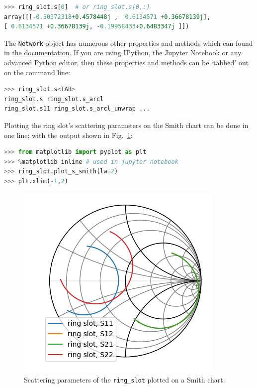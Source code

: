 \documentclass{IEEEjmw}
\begin{document}
\begin{lstlisting}[language=Python]
>>> ring_slot.s[0]  # or ring_slot.s[0,:]
array([[-0.50372318+0.4578448j ,  0.6134571 +0.36678139j],
[ 0.6134571 +0.36678139j, -0.19958433+0.6483347j ]])
\end{lstlisting}

The \texttt{Network} object has numerous other properties and methods which can found in  \href{https://scikit-rf.readthedocs.io}{the documentation}. If you are using IPython\cite{perez2007}, the Jupyter Notebook\cite{granger2021} or any advanced Python editor, then these properties and methods can be ‘tabbed’ out on the command line:

\begin{lstlisting}[language=Python]
>>> ring_slot.s<TAB>
ring_slot.s ring_slot.s_arcl
ring_slot.s11 ring_slot.s_arcl_unwrap ...
\end{lstlisting}

Plotting the ring slot’s scattering parameters on the Smith chart can be done in one line; with the output shown in Fig.~\ref{fig:figure1}:

\begin{lstlisting}[language=Python]
>>> from matplotlib import pyplot as plt
>>> %matplotlib inline # used in jupyter notebook
>>> ring_slot.plot_s_smith(lw=2)
>>> plt.xlim(-1,2)
\end{lstlisting}

\begin{figure}
	\centering
	\includegraphics[width=0.95\linewidth]{figures/figure1}
	\caption{Scattering parameters of the \texttt{ring\_slot} plotted on a Smith chart.}
	\label{fig:figure1}
\end{figure}
\end{document}
